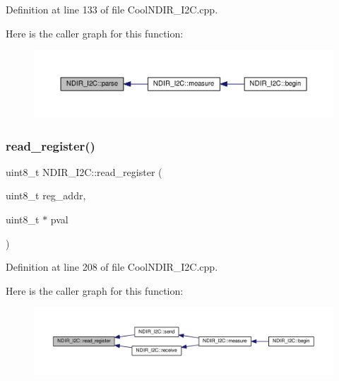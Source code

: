 Definition at line 133 of file Cool\+N\+D\+I\+R\+\_\+\+I2\+C.\+cpp.

Here is the caller graph for this function\+:
\nopagebreak
\begin{figure}[H]
\begin{center}
\leavevmode
\includegraphics[width=350pt]{class_n_d_i_r___i2_c_a907b756fc9244c7398b7d187b73cde94_icgraph}
\end{center}
\end{figure}
\mbox{\label{class_n_d_i_r___i2_c_aa72058e6e7c6174b14466fee4b2df1e0}} 
\subsubsection{\texorpdfstring{read\+\_\+register()}{read\_register()}}
{\footnotesize\ttfamily uint8\+\_\+t N\+D\+I\+R\+\_\+\+I2\+C\+::read\+\_\+register (\begin{DoxyParamCaption}\item[{uint8\+\_\+t}]{reg\+\_\+addr,  }\item[{uint8\+\_\+t $\ast$}]{pval }\end{DoxyParamCaption})\hspace{0.3cm}{\ttfamily [private]}}



Definition at line 208 of file Cool\+N\+D\+I\+R\+\_\+\+I2\+C.\+cpp.

Here is the caller graph for this function\+:
\nopagebreak
\begin{figure}[H]
\begin{center}
\leavevmode
\includegraphics[width=350pt]{class_n_d_i_r___i2_c_aa72058e6e7c6174b14466fee4b2df1e0_icgraph}
\end{center}
\end{figure}
\mbox{\label{class_n_d_i_r___i2_c_aa6d2b8dd287f9c9015461cebb18f9abc}} 

